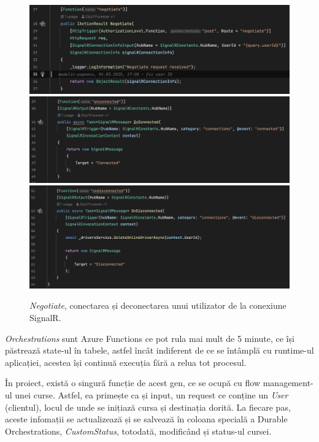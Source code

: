 \begin{figure}[H]
    \centering
    \includegraphics[width=16cm]{Assets/negotiate.png}
    \includegraphics[width=16cm]{Assets/onconnected.png}
    \includegraphics[width=16cm]{Assets/ondisconnected.png}
    \caption{\textit{Negotiate}, conectarea și deconectarea unui utilizator de la conexiune SignalR.}
    \label{fig:negotiateConnectDisconnect}
\end{figure}

\textit{Orchestrations} sunt Azure Functions ce pot rula mai mult de 5 minute, ce își păstrează
state-ul în tabele, astfel încât indiferent de ce se întâmplă cu runtime-ul aplicației,
acestea își continuă execuția fără a relua tot procesul.

În proiect, există o singură funcție de acest gen, ce se ocupă cu flow management-ul unei curse.
Astfel, ea primește ca și input, un request ce conține un \textit{User} (clientul), locul de unde se inițiază
cursa și destinația dorită. La fiecare pas, aceste infomații se actualizează și
se salvează în coloana specială a Durable Orchestrations, \textit{CustomStatus}, totodată, modificând și status-ul
cursei.

